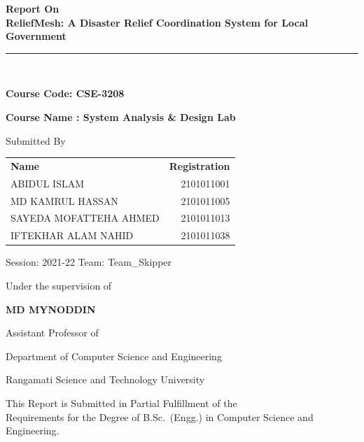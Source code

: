 \documentclass[11pt,a4paper]{report}
\newcommand{\thesistitle}{ReliefMesh: A Disaster Relief Coordination System for Local Government}
\begin{document}
\begin{titlepage}
\centering
\vspace*{0.5cm}

{\large\bfseries Report On}\\[0.3cm]
{\Large\bfseries \thesistitle}\\[0.3cm]
\vspace{-0.5cm}
\noindent\rule{15.2cm}{0.4pt}\\
\vspace{0.3cm}

{\large\bfseries Course Code: CSE-3208}\par
{\large\bfseries Course Name : System Analysis \& Design Lab}\par
\vspace{1.2cm}

{\large Submitted By}\par
\begin{center}
\begin{tabular}{@{}l r@{}}
\textbf{Name} & \textbf{Registration} \\[4pt]
ABIDUL ISLAM          & 2101011001 \\[2pt]
MD KAMRUL HASSAN      & 2101011005 \\[2pt]
SAYEDA MOFATTEHA AHMED & 2101011013 \\[2pt]
IFTEKHAR ALAM NAHID   & 2101011038 \\
\end{tabular}
\end{center}

\hspace*{0.2in}
{Session: 2021-22 \qquad Team: Team\_Skipper}\par

\vspace{1.1cm}
{\large Under the supervision of}\par
\vspace{0.4cm}
{\large\bfseries MD MYNODDIN}\par
Assistant Professor of\par
Department of Computer Science and Engineering\par
Rangamati Science and Technology University\par

\vspace{1.0cm}
This Report is Submitted in Partial Fulfillment of the\\
Requirements for the Degree of B.Sc.\ (Engg.) in Computer Science and Engineering.\par


\end{titlepage}
\end{document}
